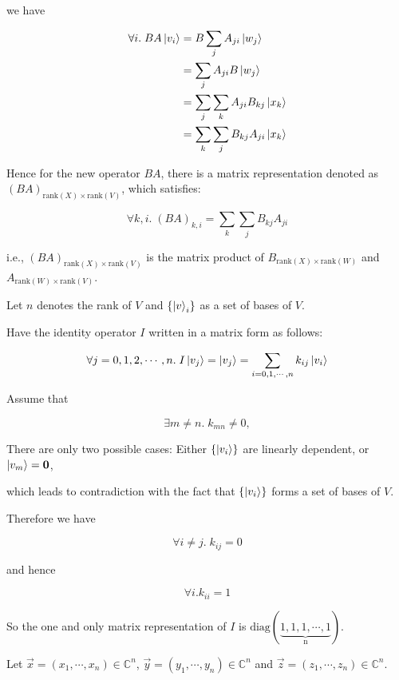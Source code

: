 \documentclass{homeworg}
\begin{document}
we have

\begin{align}
    \forall i.\; BA\ket{v_i}&=B\sum_{j}A_{ji}\ket{w_j}\nonumber\\
    &=\sum_{j}A_{ji}B\ket{w_j}\nonumber\\
    &=\sum_{j}\sum_{k}A_{ji}B_{kj}\ket{x_k}\nonumber\\
    &=\sum_{k}\sum_{j}B_{kj}A_{ji}\ket{x_k}\nonumber
\end{align}

Hence for the new operator $BA$, there is a matrix representation denoted as $(BA)_{\mathrm{rank}(X)\times \mathrm{rank}(V)}$, which satisfies:

\[\forall{k,i}.\; (BA)_{k,i}=\sum_{k}\sum_{j}B_{kj}A_{ji}\]

i.e., $(BA)_{\mathrm{rank}(X)\times \mathrm{rank}(V)}$ is the matrix product of $B_{\mathrm{rank}(X)\times \mathrm{rank}(W)}$ and $A_{\mathrm{rank}(W)\times \mathrm{rank}(V)}$.

\exercise*
Let $n$ denotes the rank of $V$ and $\{\ket{v}_i\}$ as a set of bases of $V$.

Have the identity operator $I$ written in a matrix form as follows:

\[\forall{j=0,1,2,\cdots, n}.\;I\ket{v_j}=\ket{v_j}=\sum_{i=0,1,\cdots,n}k_{ij}\ket{v_i}\]

Assume that 

\[\exists{m\neq n}.\;k_{mn}\neq0,\]

There are only two possible cases: Either $\{\ket{v_i}\}$ are linearly dependent, or $\ket{v_m}=\bm{0}$,

which leads to contradiction with the fact that $\{\ket{v_i}\}$ forms a set of bases of $V$.

Therefore we have

\[\forall{i\neq j}.\;k_{ij}=0\]

and hence 

\[\forall i. k_{ii} = 1\]

So the one and only matrix representation of $I$ is $\mathrm{diag(\underbrace{1,1,1,\cdots,1}_{n})}$.

\exercise*
Let $\vec{x}=(x_1,\cdots,x_n)\in \mathbb{C}^n$, $\vec{y}=(y_1,\cdots,y_n)\in \mathbb{C}^n$ and  $\vec{z} =(z_1,\cdots,z_n)\in \mathbb{C}^n$.
\end{document}

